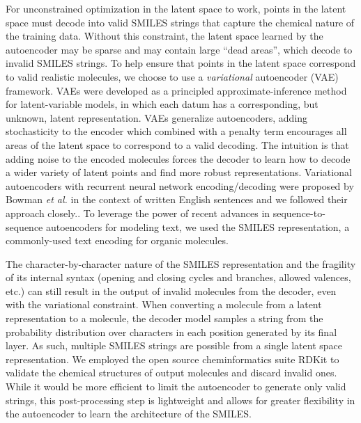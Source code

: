 For unconstrained optimization in the latent space to work, points in the latent space must decode into valid SMILES strings that capture the chemical nature of the training data.
Without this constraint, the latent space learned by the autoencoder may be sparse and may contain large ``dead areas'', which decode to invalid SMILES strings.
To help ensure that points in the latent space correspond to valid realistic molecules, we choose to use a \emph{variational} autoencoder (VAE)\cite{kingma2013auto} framework.
VAEs were developed as a principled approximate-inference method for latent-variable models, in which each datum has a corresponding, but unknown, latent representation.
VAEs generalize autoencoders, adding stochasticity to the encoder which combined with a penalty term encourages all areas of the latent space to correspond to a valid decoding.
The intuition is that adding noise to the encoded molecules forces the decoder to learn how to decode a wider variety of latent points and find more robust representations.
Variational autoencoders with recurrent neural network encoding/decoding were proposed by Bowman \textit{et al.} in the context of written English sentences and we followed their approach closely.\cite{bowman2015generating}.
To leverage the power of recent advances in sequence-to-sequence autoencoders for modeling text, we used the SMILES\cite{Weininger_1988} representation, a commonly-used text encoding for organic molecules.

The character-by-character nature of the SMILES representation and the fragility of its internal syntax (opening and closing cycles and branches, allowed valences, etc.) can still result in the output of invalid molecules from the decoder, even with the variational constraint.
When converting a molecule from a latent representation to a molecule, the decoder model samples a string from the probability distribution over characters in each position generated by its final layer. As such, multiple SMILES strings are possible from a single latent space representation. We employed the open source cheminformatics suite RDKit\cite{rdkit} to validate the chemical structures of output molecules and discard invalid ones.
While it would be more efficient to limit the autoencoder to generate only valid strings, this post-processing step is lightweight and allows for greater flexibility in the autoencoder to learn the architecture of the SMILES.

